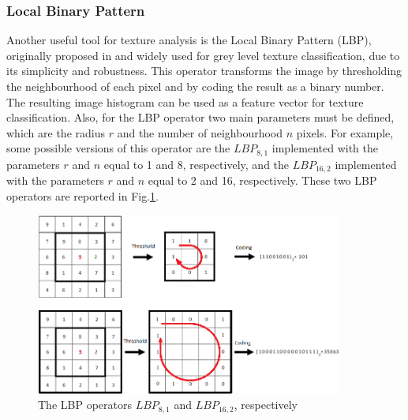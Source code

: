 \documentclass[final,a4paper,12pt,english]{UnicaPhdThesis3}
\begin{document}
	\subsubsection{Local Binary Pattern} \label{LBP}
	Another useful tool for texture analysis is the Local Binary Pattern (\acs{LBP}), originally proposed in \cite{Ojala} and widely used for grey level texture classification, due to its simplicity and robustness. This operator transforms the image by thresholding the neighbourhood of each pixel and by coding the result as a binary number. The resulting image histogram can be used as a feature vector for texture classification. Also, for the LBP operator two main parameters must be defined, which are the radius $r$ and the number of neighbourhood $n$ pixels. For example, some possible versions of this operator are the $LBP_{8,1}$ implemented with the parameters $r$ and $n$ equal to 1 and 8, respectively, and the  $LBP_{16,2}$ implemented with the parameters $r$ and $n$ equal to 2 and 16, respectively. These two LBP operators are reported in Fig.\ref{fig:LBP}.
	
	\begin{figure}[!t]
		\centering
		\includegraphics[width=0.90\textwidth]{images/LBP}
		\caption{\label{fig:LBP}The LBP operators $LBP_{8,1}$  and $LBP_{16,2}$, respectively  }
	\end{figure}
	
\end{document}
